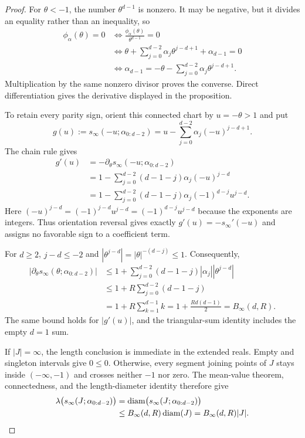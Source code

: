 \begin{proof}
For $\theta<-1$, the number $\theta^{d-1}$ is nonzero.  It may be negative,
but it divides an equality rather than an inequality, so
\[
\begin{aligned}
\phi_\alpha(\theta)=0
&\Longleftrightarrow \frac{\phi_\alpha(\theta)}{\theta^{d-1}}=0\\
&\Longleftrightarrow
\theta+\sum_{j=0}^{d-2}\alpha_j\theta^{j-d+1}
+\alpha_{d-1}=0\\
&\Longleftrightarrow
\alpha_{d-1}=-\theta-\sum_{j=0}^{d-2}\alpha_j\theta^{j-d+1}.
\end{aligned}
\]
Multiplication by the same nonzero divisor proves the converse.  Direct
differentiation gives the derivative displayed in the proposition.

To retain every parity sign, orient this connected chart by $u=-\theta>1$
and put
\[
g(u):=s_\infty(-u;\alpha_{0:d-2})
=u-\sum_{j=0}^{d-2}\alpha_j(-u)^{j-d+1}.
\]
The chain rule gives
\[
\begin{aligned}
g'(u)
&=-\partial_\theta s_\infty(-u;\alpha_{0:d-2})\\
&=1-\sum_{j=0}^{d-2}(d-1-j)\alpha_j(-u)^{j-d}\\
&=1-\sum_{j=0}^{d-2}(d-1-j)\alpha_j
(-1)^{d-j}u^{j-d}.
\end{aligned}
\]
Here $(-u)^{j-d}=(-1)^{j-d}u^{j-d}=(-1)^{d-j}u^{j-d}$ because the exponents
are integers.  Thus orientation reversal gives exactly
$g'(u)=-s_\infty'(-u)$ and assigns no favorable sign to a coefficient term.

For $d\geq2$, $j-d\leq-2$ and
$|\theta^{j-d}|=|\theta|^{-(d-j)}\leq1$.  Consequently,
\[
\begin{aligned}
|\partial_\theta s_\infty(\theta;\alpha_{0:d-2})|
&\leq1+\sum_{j=0}^{d-2}(d-1-j)|\alpha_j||\theta^{j-d}|\\
&\leq1+R\sum_{j=0}^{d-2}(d-1-j)\\
&=1+R\sum_{k=1}^{d-1}k
=1+\frac{Rd(d-1)}2=B_\infty(d,R).
\end{aligned}
\]
The same bound holds for $|g'(u)|$, and the triangular-sum identity includes
the empty $d=1$ sum.

If $|J|=\infty$, the length conclusion is immediate in the extended reals.
Empty and singleton intervals give $0\leq0$.  Otherwise, every segment
joining points of $J$ stays inside $(-\infty,-1)$ and crosses neither $-1$
nor zero.  The mean-value theorem, connectedness, and the length-diameter
identity therefore give
\[
\begin{aligned}
\lambda\bigl(s_\infty(J;\alpha_{0:d-2})\bigr)
&=\operatorname{diam}\bigl(s_\infty(J;\alpha_{0:d-2})\bigr)\\
&\leq B_\infty(d,R)\operatorname{diam}(J)
=B_\infty(d,R)|J|.
\end{aligned}
\]


\end{proof}
